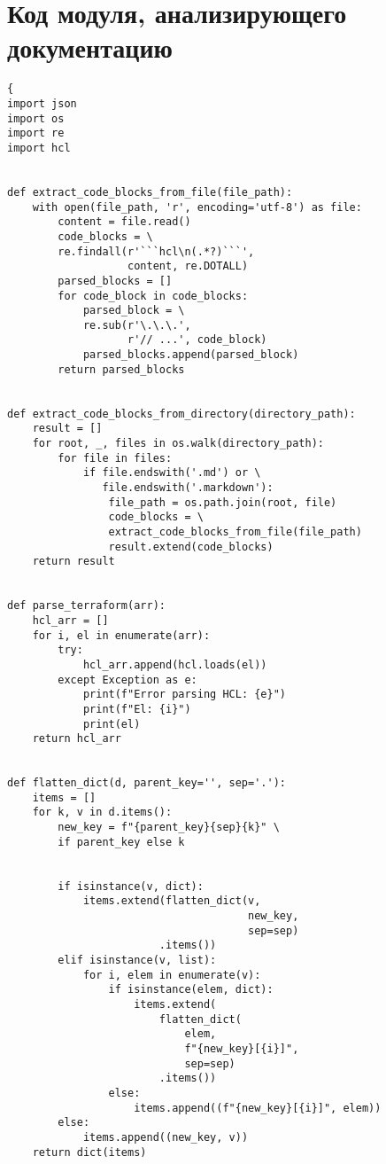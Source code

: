 ﻿\chapter{Код модуля, анализирующего документацию}\label{sec:appendix3}

\begin{verbatim}
{
import json
import os
import re
import hcl


def extract_code_blocks_from_file(file_path):
    with open(file_path, 'r', encoding='utf-8') as file:
        content = file.read()
        code_blocks = \
        re.findall(r'```hcl\n(.*?)```',
                   content, re.DOTALL)
        parsed_blocks = []
        for code_block in code_blocks:
            parsed_block = \
            re.sub(r'\.\.\.',
                   r'// ...', code_block)
            parsed_blocks.append(parsed_block)
        return parsed_blocks


def extract_code_blocks_from_directory(directory_path):
    result = []
    for root, _, files in os.walk(directory_path):
        for file in files:
            if file.endswith('.md') or \
               file.endswith('.markdown'):
                file_path = os.path.join(root, file)
                code_blocks = \
                extract_code_blocks_from_file(file_path)
                result.extend(code_blocks)
    return result


def parse_terraform(arr):
    hcl_arr = []
    for i, el in enumerate(arr):
        try:
            hcl_arr.append(hcl.loads(el))
        except Exception as e:
            print(f"Error parsing HCL: {e}")
            print(f"El: {i}")
            print(el)
    return hcl_arr


def flatten_dict(d, parent_key='', sep='.'):
    items = []
    for k, v in d.items():
        new_key = f"{parent_key}{sep}{k}" \
        if parent_key else k


        if isinstance(v, dict):
            items.extend(flatten_dict(v,
                                      new_key,
                                      sep=sep)
                        .items())
        elif isinstance(v, list):
            for i, elem in enumerate(v):
                if isinstance(elem, dict):
                    items.extend(
                        flatten_dict(
                            elem, 
                            f"{new_key}[{i}]",
                            sep=sep)
                        .items())
                else:
                    items.append((f"{new_key}[{i}]", elem))
        else:
            items.append((new_key, v))
    return dict(items)



\end{verbatim}
